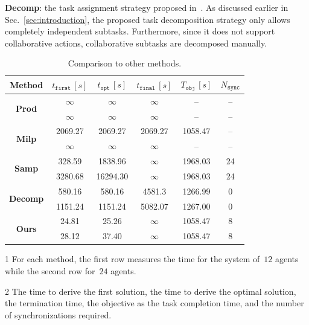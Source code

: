 \textbf{Decomp}: the task assignment strategy proposed
in~\cite{schillinger2018simultaneous}.
As discussed earlier in Sec.~\ref{sec:introduction},
the proposed task decomposition strategy only allows completely
independent subtasks.
Furthermore, since it does not support collaborative actions,
collaborative subtasks are decomposed manually.
\begin{table}[t]
  \centering
  \begin{threeparttable}
	\caption{Comparison to other methods.}
	\label{table:compare}
	\begin{tabular}{|c|c|c|c|c|c|}\hline
	  \tnote{1} Method & \tnote{2} $t_{\texttt{first}}\, [s]$
          & \tnote{2} $t_{\texttt{opt}}\, [s]$
	  & \tnote{2} $t_{\texttt{final}}\,[s]$ & \tnote{2} $T_{\texttt{obj}}\,[s]$
          & \tnote{2} $N_{\texttt{sync}}$ \\[0.5ex] \hline
		\multirow{2}{*}{\textbf{Prod}}& $\infty$ & $\infty$ & $\infty$ & -- & -- \\[0.5ex]
                 & $\infty$ & $\infty$ & $\infty$ & -- & -- \\[0.5ex]
                \hline
		\multirow{2}{*}{\textbf{Milp}} & 2069.27 & 2069.27 & 2069.27 & 1058.47 & -- \\[0.5ex]
                &$\infty$ &$\infty$ & $\infty$ & -- & --  \\[0.5ex]
                \hline
		\multirow{2}{*}{\textbf{Samp}} & 328.59 & 1838.96 & $\infty$ & 1968.03 & 24 \\[0.5ex]
                 & 3280.68 &  16294.30 & $\infty$ & 1968.03 & 24 \\[0.5ex]
                \hline
		\multirow{2}{*}{\textbf{Decomp}} & 580.16 & 580.16 & 4581.3 & 1266.99 & 0 \\[0.5ex]
		 & 1151.24 & 1151.24 & 5082.07 & 1267.00 & 0 \\[0.5ex]
                \hline
		\multirow{2}{*}{\textbf{Ours}} & 24.81 & 25.26 & $\infty$ & 1058.47 & 8 \\[0.5ex]
                 & 28.12 & 37.40 & $\infty$ & 1058.47 & 8 \\[0.5ex]
		\hline
	\end{tabular}
  \begin{tablenotes}
  \item[1] For each method, the first row measures the time for the
    system of~$12$ agents while the second row for~$24$ agents.
  \item[2] The time to derive the first solution,
    the time to derive the optimal solution,
    the termination time, the objective as the task completion time,
and the number of synchronizations required.
  \end{tablenotes}
   \end{threeparttable}
\end{table}

